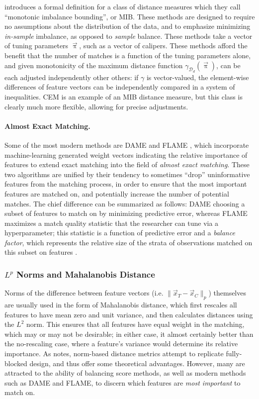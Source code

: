 \documentclass[11pt]{extarticle}
\begin{document}
\textcite{iacus_multivariate_2011} introduces a formal definition for a class of distance measures which they call ``monotonic imbalance bounding'', or MIB. These methods are designed to require no assumptions about the distribution of the data, and to emphasize minimizing \emph{in-sample} imbalance, as opposed to \emph{sample} balance. These methods take a vector of tuning parameters $\vec{\uppi}$, such as a vector of calipers. These methods afford the benefit that the number of matches is a function of the tuning parameters alone, and given monotonicity of the maximum distance function $\gamma_{\mathcal{D}_{d}}(\vec{\uppi})$, can be each adjusted independently other others: if $\gamma$ is vector-valued, the element-wise differences of feature vectors can be independently compared in a system of inequalities. CEM is an example of an MIB distance measure, but this class is clearly much more flexible, allowing for precise adjustments.

\paragraph{Almost Exact Matching.} Some of the most modern methods are DAME \parencite{liu_interpretable_2019} and FLAME \cite{wang_flame_2021}, which incorporate machine-learning generated weight vectors indicating the relative importance of features to extend exact matching into the field of \emph{almost exact matching}. These two algorithms are unified by their tendency to sometimes ``drop'' uninformative features from the matching process, in order to ensure that the most important features are matched on, and potentially increase the number of potential matches. The chief difference can be summarized as follows: DAME choosing a subset of features to match on by minimizing predictive error, whereas FLAME maximizes a match quality statistic that the researcher can tune via a hyperparameter; this statistic is a function of predictive error and a \emph{balance factor}, which represents the relative size of the strata of observations matched on this subset on features \parencite{gupta_dame-flame_2021}.

\subsubsection{$L^p$ Norms and Mahalanobis Distance}
\label{subsubsec:normdist}

Norms of the difference between feature vectors (i.e. $\| \vec{x}_T - \vec{x}_C \|_p$) themselves are usually used in the form of Mahalanobis distance, which first rescales all features to have mean zero and unit variance, and then calculates distances using the $L^2$ norm.
This ensures that all features have equal weight in the matching, which may or may not be desirable; in either case, it almost certainly better than the no-rescaling case, where a feature's variance would determine its relative importance.
As \textcite{king_why_2019} notes, norm-based distance metrics attempt to replicate fully-blocked design, and thus offer some theoretical advantages.
However, many are attracted to the ability of balancing score methods, as well as modern methods such as DAME and FLAME, to discern which features are \emph{most important} to match on. 
\end{document}
